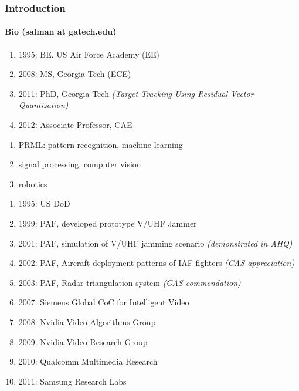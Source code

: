 \begin{frame}
\frametitle{Introduction}
\framesubtitle{Bio (salman at gatech.edu)}
\mypagenum{}
\begin{changemargin}{-0.24in}{0in}
\vspace{0.1in}
\begin{enumerate}\scriptsize
\item 1995: BE, US Air Force Academy (EE)
\item 2008: MS, Georgia Tech (ECE)
\item 2011: PhD, Georgia Tech \emph{\tiny (Target Tracking Using Residual Vector Quantization)}
\item 2012: Associate Professor, CAE
\end{enumerate}


\vspace{0.2in}
\begin{enumerate}\scriptsize
\item PRML: pattern recognition, machine learning
\item signal processing, computer vision
\item robotics
\end{enumerate}

\vspace{0.2in}
\begin{enumerate}\scriptsize
\item 1995: US DoD %
\item 1999: PAF, developed prototype V/UHF Jammer
\item 2001: PAF, simulation of V/UHF jamming scenario \emph{\tiny (demonstrated in AHQ)}
\item 2002: PAF, Aircraft deployment patterns of IAF fighters \emph{\tiny (CAS appreciation)}
\item 2003: PAF, Radar triangulation system \emph{\tiny (CAS commendation)}
\item 2007: Siemens Global CoC for Intelligent Video %
\item 2008: Nvidia Video Algorithms Group %
\item 2009: Nvidia Video Research Group  %
\item 2010: Qualcomm Multimedia Research %
\item 2011: Samsung Research Labs %
\end{enumerate}
\end{changemargin}
\end{frame}
